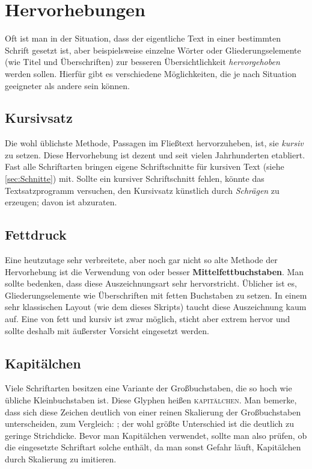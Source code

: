 \chapter{Hervorhebungen}

Oft ist man in der Situation, dass der eigentliche Text in einer bestimmten
Schrift gesetzt ist, aber beispielsweise einzelne Wörter oder
Gliederungselemente (wie Titel und Überschriften) zur besseren Übersichtlichkeit
\emph{hervorgehoben} werden sollen. Hierfür gibt es verschiedene Möglichkeiten, die
je nach Situation geeigneter als andere sein können.

\section{Kursivsatz}

Die wohl üblichste Methode, Passagen im Fließtext hervorzuheben, ist, sie
\emph{kursiv} zu setzen. Diese Hervorhebung ist dezent und seit vielen
Jahrhunderten etabliert. Fast alle Schriftarten bringen eigene Schriftschnitte
für kursiven Text (siehe \cref{sec:Schnitte}) mit. Sollte ein kursiver
Schriftschnitt fehlen, könnte das Textsatzprogramm versuchen, den Kursivsatz
künstlich durch \textsl{Schrägen} zu erzeugen; davon ist abzuraten.

\section{Fettdruck}

Eine heutzutage sehr verbreitete, aber noch gar nicht so alte Methode der
Hervorhebung ist die Verwendung von {\selectfont {Fett-}} oder
besser \textbf{Mittelfettbuchstaben}. Man sollte bedenken, dass diese
Auszeichnungsart sehr hervorstricht. Üblicher ist es, Gliederungselemente wie
Überschriften mit fetten Buchstaben zu setzen. In einem sehr klassischen Layout
(wie dem dieses Skripts) taucht diese Auszeichnung kaum auf. Eine
\emph{{\selectfont{Kombination}}} von fett und kursiv ist zwar
möglich, sticht aber extrem hervor und sollte deshalb mit äußerster Vorsicht
eingesetzt werden.

\section{Kapitälchen}

Viele Schriftarten besitzen eine Variante der Großbuchstaben, die so hoch wie
übliche Kleinbuchstaben ist. Diese Glyphen heißen \textsc{kapitälchen}. Man
bemerke, dass sich diese Zeichen deutlich von einer reinen Skalierung der
Großbuchstaben unterscheiden, zum Vergleich: ; der
wohl größte Unterschied ist die deutlich zu geringe Strichdicke. Bevor man
Kapitälchen verwendet, sollte man also prüfen, ob die eingesetzte Schriftart
solche enthält, da man sonst Gefahr läuft, Kapitälchen durch Skalierung zu
imitieren.

